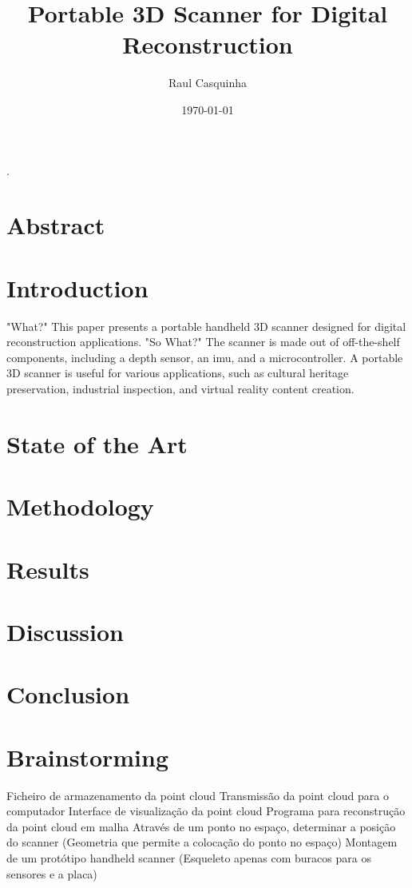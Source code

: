 \documentclass{article}
\title{Portable 3D Scanner for Digital Reconstruction}
\author{Raul Casquinha}
\date{\today}
\begin{document}
\maketitle

\cite{wang_mems_2020}.

\section{Abstract}

\tableofcontents

\section{Introduction}
"What?"
This paper presents a portable handheld 3D scanner designed for digital reconstruction applications. 
"So What?"
The scanner is made out of off-the-shelf components, including a depth sensor, an \gls{imu}, and a microcontroller.
A portable 3D scanner is useful for various applications, such as cultural heritage preservation, industrial inspection, and virtual reality content creation. %

\section{State of the Art}

\section{Methodology}

\section{Results}

\section{Discussion}

\section{Conclusion}

\section{Brainstorming}

Ficheiro de armazenamento da point cloud
Transmissão da point cloud para o computador
Interface de visualização da point cloud
Programa para reconstrução da point cloud em malha
Através de um ponto no espaço, determinar a posição do scanner (Geometria que permite a colocação do ponto no espaço)
Montagem de um protótipo handheld scanner (Esqueleto apenas com buracos para os sensores e a placa)


\printbibliography
\end{document}
